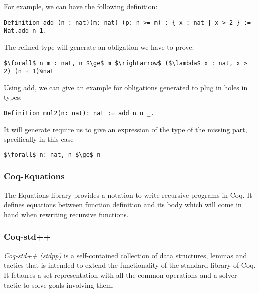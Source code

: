 For example, we can have the following definition:

\begin{lstlisting}[style=myCoqstyle]
Definition add (n : nat)(m: nat) (p: n >= m) : { x : nat | x > 2 } :=
Nat.add n 1.
\end{lstlisting}

The refined type will generate an obligation we have to prove:
\begin{lstlisting}[style=myCoqstyle]
$\forall$ n m : nat, n $\ge$ m $\rightarrow$ ($\lambda$ x : nat, x > 2) (n + 1)%nat
\end{lstlisting}

Using add, we can give an example for obligations generated to plug in holes in types:

\begin{lstlisting}[style=myCoqstyle]
Definition mul2(n: nat): nat := add n n _.
\end{lstlisting}

It will generate require us to give an expression of the type of the missing part, specifically in this case

\begin{lstlisting}[style=myCoqstyle]
$\forall$ n: nat, n $\ge$ n
\end{lstlisting}

\subsubsection{Coq-Equations}

The Equations library provides a notation to write recursive programs in Coq. It defines equations between function definition and its body which will come in hand when rewriting recursive functions.

\subsubsection{Coq-std++}

\emph{Coq-std++ (stdpp)} is a self-contained collection of data structures, lemmas and tactics that is intended to extend the functionality of the standard library of Coq. It fetaures a set representation with all the common operations and a solver tactic to solve goals involving them.

